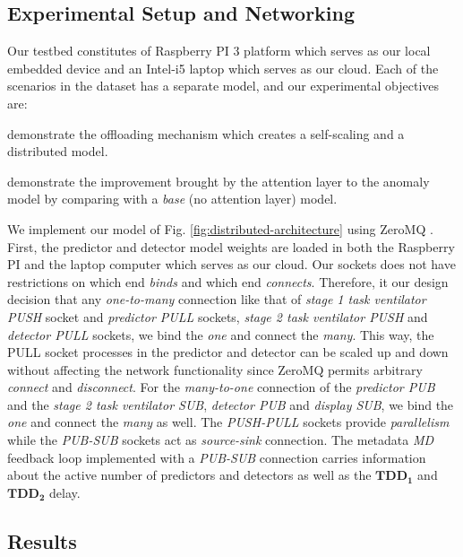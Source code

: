 \subsection{Experimental Setup and Networking}
Our testbed constitutes of Raspberry PI 3 platform which serves as our local 
embedded device and an Intel-i5 laptop which serves as our cloud. Each of the 
scenarios in the dataset has a separate model, and our 
experimental objectives are:
\begin{enumerate*}[label={\alph*)},font={\bfseries}]
	\item demonstrate the offloading mechanism which creates a self-scaling and 
	a distributed model.  
	\item demonstrate the improvement brought by the attention layer to the 
	anomaly model by comparing with a \emph{base} (no attention layer) model.
\end{enumerate*}
We implement our model of Fig. \ref{fig:distributed-architecture} using ZeroMQ 
\cite{Akgul:ZEROMQ}. First, the predictor and detector model weights are loaded 
in both the Raspberry PI and the laptop computer which serves as our 
cloud. Our sockets does not have restrictions on which end \emph{binds} and 
which end \emph{connects}. Therefore, it our design decision that any 
\emph{one-to-many} connection like that of \emph{stage 1 task ventilator PUSH} 
socket and \emph{predictor PULL} sockets, \emph{stage 2 task ventilator PUSH} 
and \emph{detector PULL} sockets, we bind the \emph{one} and connect the 
\emph{many}. This way, the PULL socket processes in the predictor and detector 
can be scaled up and down without affecting the network functionality since 
ZeroMQ permits arbitrary 
\emph{connect} and \emph{disconnect}. For the \emph{many-to-one} connection of 
the \emph{predictor PUB} and the \emph{stage 2 task ventilator SUB}, 
\emph{detector PUB} and \emph{display SUB}, we bind the \emph{one} and connect 
the \emph{many} as well. The \emph{PUSH-PULL} sockets provide 
\emph{parallelism} while the \emph{PUB-SUB} sockets act as \emph{source-sink} 
connection. The metadata \emph{MD} feedback loop implemented with a 
\emph{PUB-SUB} connection carries 
information about the active number of predictors and detectors as well as the 
$ \bm{TDD_1} 
$ and $ \bm{TDD_2} $ delay.
\subsection{Results}
